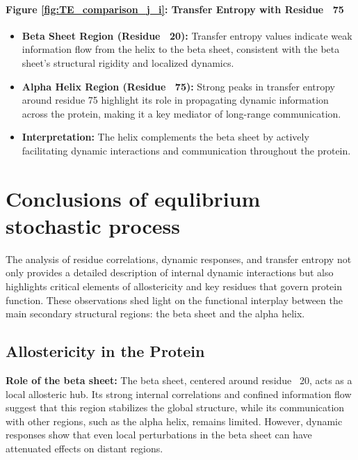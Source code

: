 \documentclass[English, Lau, oneside]{sapthesis}
\begin{document}
\paragraph{Figure \ref{fig:TE_comparison_j_i}: Transfer Entropy with Residue ~75}
\begin{itemize}
    \item \textbf{Beta Sheet Region (Residue ~20):} Transfer entropy values indicate weak information flow from the helix to the beta sheet, consistent with the beta sheet's structural rigidity and localized dynamics.
    \item \textbf{Alpha Helix Region (Residue ~75):} Strong peaks in transfer entropy around residue 75 highlight its role in propagating dynamic information across the protein, making it a key mediator of long-range communication.
    \item \textbf{Interpretation:} The helix complements the beta sheet by actively facilitating dynamic interactions and communication throughout the protein.
\end{itemize}



\newpage
\newpage






\section{Conclusions of equlibrium stochastic process}
The analysis of residue correlations, dynamic responses, and transfer entropy not only provides a detailed description of internal dynamic interactions but also highlights critical elements of allostericity and key residues that govern protein function. These observations shed light on the functional interplay between the main secondary structural regions: the beta sheet and the alpha helix.

\subsection{Allostericity in the Protein}

\textbf{Role of the beta sheet:} The beta sheet, centered around residue ~20, acts as a local allosteric hub. Its strong internal correlations and confined information flow suggest that this region stabilizes the global structure, while its communication with other regions, such as the alpha helix, remains limited. However, dynamic responses show that even local perturbations in the beta sheet can have attenuated effects on distant regions.
\end{document}
